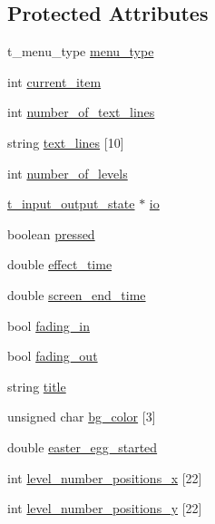 \subsection*{Protected Attributes}
\begin{DoxyCompactItemize}
\item 
t\-\_\-menu\-\_\-type \hyperlink{classc__menu_a1e0be6c7749c393b11b4a1f8330588f8}{menu\-\_\-type}
\item 
int \hyperlink{classc__menu_a5ccfb7e7c08dd3b70b7ddf5fd1f00308}{current\-\_\-item}
\item 
int \hyperlink{classc__menu_a4000a7ae156999a6e2ea273ab328a0f1}{number\-\_\-of\-\_\-text\-\_\-lines}
\item 
string \hyperlink{classc__menu_ade57856309857147f055d82f1e7d839e}{text\-\_\-lines} \mbox{[}10\mbox{]}
\item 
int \hyperlink{classc__menu_a3fe87a5b76e64557af759a180b0bb0ae}{number\-\_\-of\-\_\-levels}
\item 
\hyperlink{structt__input__output__state}{t\-\_\-input\-\_\-output\-\_\-state} $\ast$ \hyperlink{classc__menu_ae21342c5213a9d1f75932af186f65327}{io}
\item 
boolean \hyperlink{classc__menu_a3181439816433cf8a2b42dcaf7fbfea7}{pressed}
\item 
double \hyperlink{classc__menu_ae035b1a97b2334a285e3db7e00b0bdac}{effect\-\_\-time}
\item 
double \hyperlink{classc__menu_a55a8c30640f0cd40b1ac7db29644d050}{screen\-\_\-end\-\_\-time}
\item 
bool \hyperlink{classc__menu_ae983a894c3afee8671ed9f0fefd1b6a9}{fading\-\_\-in}
\item 
bool \hyperlink{classc__menu_a72afb1bd10e583b642922b2a3b1d799b}{fading\-\_\-out}
\item 
string \hyperlink{classc__menu_a04174390379e68ec20a0ec5945748570}{title}
\item 
unsigned char \hyperlink{classc__menu_a24f640c1886fdf22053a50f8700d559f}{bg\-\_\-color} \mbox{[}3\mbox{]}
\item 
double \hyperlink{classc__menu_af9c750db5db9b548d4d936e30dfe314f}{easter\-\_\-egg\-\_\-started}
\item 
int \hyperlink{classc__menu_a39f79196e63fb1e14ac437c2d88c8c7d}{level\-\_\-number\-\_\-positions\-\_\-x} \mbox{[}22\mbox{]}
\item 
int \hyperlink{classc__menu_ac4f208edba8bee1d6184db03e3a89e41}{level\-\_\-number\-\_\-positions\-\_\-y} \mbox{[}22\mbox{]}
\item 

\end{DoxyCompactItemize}
